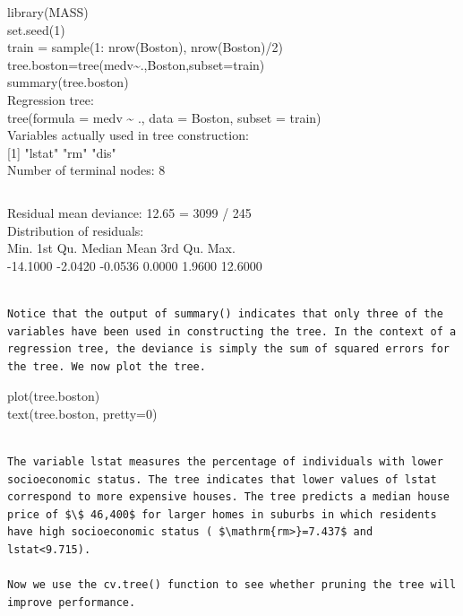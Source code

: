 \documentclass[10pt]{article}
\begin{document}
\begin{displayquote}
library(MASS)\\
set.seed(1)\\
train = sample(1: nrow(Boston), nrow(Boston)/2)\\
tree.boston=tree(medv\~{}.,Boston,subset=train)\\
summary(tree.boston)\\
Regression tree:\\
tree(formula = medv \~{} ., data = Boston, subset = train)\\
Variables actually used in tree construction:\\[0pt]
[1] "lstat" "rm" "dis"\\
Number of terminal nodes: 8
\end{displayquote}

\begin{verbatim}

\end{verbatim}

Residual mean deviance: 12.65 = 3099 / 245\\
Distribution of residuals:\\
Min. 1st Qu. Median Mean 3rd Qu. Max.\\
-14.1000 -2.0420 -0.0536 0.0000 1.9600 12.6000

\begin{verbatim}

Notice that the output of summary() indicates that only three of the variables have been used in constructing the tree. In the context of a regression tree, the deviance is simply the sum of squared errors for the tree. We now plot the tree.
\end{verbatim}

\begin{displayquote}
plot(tree.boston)\\
text(tree.boston, pretty=0)
\end{displayquote}

\begin{verbatim}

The variable lstat measures the percentage of individuals with lower socioeconomic status. The tree indicates that lower values of lstat correspond to more expensive houses. The tree predicts a median house price of $\$ 46,400$ for larger homes in suburbs in which residents have high socioeconomic status ( $\mathrm{rm>}=7.437$ and lstat<9.715).

Now we use the cv.tree() function to see whether pruning the tree will improve performance.
\end{verbatim}
\end{document}

